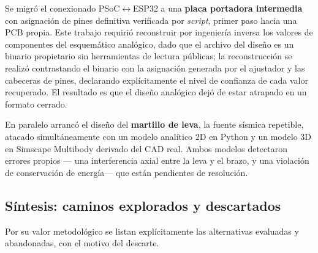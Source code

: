 Se migr\'o el conexionado PSoC$\leftrightarrow$ESP32 a una \textbf{placa portadora
intermedia} con asignaci\'on de pines definitiva verificada por \emph{script}, primer paso
hacia una PCB propia. Este trabajo requiri\'o reconstruir por ingenier\'ia inversa los
valores de componentes del esquem\'atico anal\'ogico, dado que el archivo del dise\~no es un
binario propietario sin herramientas de lectura p\'ublicas; la reconstrucci\'on se realiz\'o
contrastando el binario con la asignaci\'on generada por el ajustador y las cabeceras de
pines, declarando expl\'icitamente el nivel de confianza de cada valor recuperado. El
resultado es que el dise\~no anal\'ogico dej\'o de estar atrapado en un formato cerrado.

En paralelo arranc\'o el dise\~no del \textbf{martillo de leva}, la fuente s\'ismica
repetible, atacado simult\'aneamente con un modelo anal\'itico 2D en Python y un modelo 3D
en Simscape Multibody derivado del CAD real. Ambos modelos detectaron errores propios ---
una interferencia axial entre la leva y el brazo, y una violaci\'on de conservaci\'on de
energ\'ia--- que est\'an pendientes de resoluci\'on.

\subsection{S\'intesis: caminos explorados y descartados}

Por su valor metodol\'ogico se listan expl\'icitamente las alternativas evaluadas y
abandonadas, con el motivo del descarte.

